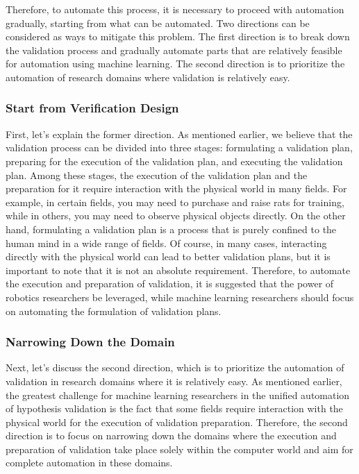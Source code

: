 \documentclass{book}
\begin{document}
Therefore, to automate this process, it is necessary to proceed with automation gradually, starting from what can be automated. Two directions can be considered as ways to mitigate this problem. The first direction is to break down the validation process and gradually automate parts that are relatively feasible for automation using machine learning. The second direction is to prioritize the automation of research domains where validation is relatively easy. 

\subsubsection{Start from Verification Design}

First, let's explain the former direction. As mentioned earlier, we believe that the validation process can be divided into three stages: formulating a validation plan, preparing for the execution of the validation plan, and executing the validation plan. Among these stages, the execution of the validation plan and the preparation for it require interaction with the physical world in many fields. For example, in certain fields, you may need to purchase and raise rats for training, while in others, you may need to observe physical objects directly. On the other hand, formulating a validation plan is a process that is purely confined to the human mind in a wide range of fields. Of course, in many cases, interacting directly with the physical world can lead to better validation plans, but it is important to note that it is not an absolute requirement. Therefore, to automate the execution and preparation of validation, it is suggested that the power of robotics researchers be leveraged, while machine learning researchers should focus on automating the formulation of validation plans. 

\subsubsection{Narrowing Down the Domain}

Next, let's discuss the second direction, which is to prioritize the automation of validation in research domains where it is relatively easy. As mentioned earlier, the greatest challenge for machine learning researchers in the unified automation of hypothesis validation is the fact that some fields require interaction with the physical world for the execution of validation preparation. Therefore, the second direction is to focus on narrowing down the domains where the execution and preparation of validation take place solely within the computer world and aim for complete automation in these domains.
\end{document}
